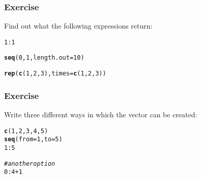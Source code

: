\documentclass[12pt]{beamer}\usepackage[]{graphicx}\usepackage[]{color}
\makeatletter
\newcommand{\hlnum}[1]{\textcolor[rgb]{0.686,0.059,0.569}{#1}}%
\newcommand{\hlcom}[1]{\textcolor[rgb]{0.678,0.584,0.686}{\textit{#1}}}%
\newcommand{\hlopt}[1]{\textcolor[rgb]{0,0,0}{#1}}%
\newcommand{\hlstd}[1]{\textcolor[rgb]{0.345,0.345,0.345}{#1}}%
\newcommand{\hlkwc}[1]{\textcolor[rgb]{0.333,0.667,0.333}{#1}}%
\newcommand{\hlkwd}[1]{\textcolor[rgb]{0.737,0.353,0.396}{\textbf{#1}}}%
\newenvironment{kframe}{%
 \def\at@end@of@kframe{}%
 \ifinner\ifhmode%
  \def\at@end@of@kframe{\end{minipage}}%
  \begin{minipage}{\columnwidth}%
 \fi\fi%
 \def\FrameCommand##1{\hskip\@totalleftmargin \hskip-\fboxsep
 \colorbox{shadecolor}{##1}\hskip-\fboxsep
     \hskip-\linewidth \hskip-\@totalleftmargin \hskip\columnwidth}%
 \MakeFramed {\advance\hsize-\width
   \@totalleftmargin\z@ \linewidth\hsize
   \@setminipage}}%
 {\par\unskip\endMakeFramed%
 \at@end@of@kframe}
\newenvironment{knitrout}{}{} %
\makeatother
\begin{document}

\begin{frame}[fragile]
\frametitle{Exercise}

Find out what the following expressions return:
\begin{knitrout}\footnotesize
{}\color{fgcolor}\begin{kframe}
\begin{alltt}
\hlnum{1}\hlopt{:}\hlnum{1}

\hlkwd{seq}\hlstd{(}\hlnum{0}\hlstd{,} \hlnum{1}\hlstd{,} \hlkwc{length.out} \hlstd{=} \hlnum{10}\hlstd{)}

\hlkwd{rep}\hlstd{(}\hlkwd{c}\hlstd{(}\hlnum{1}\hlstd{,} \hlnum{2}\hlstd{,} \hlnum{3}\hlstd{),} \hlkwc{times} \hlstd{=} \hlkwd{c}\hlstd{(}\hlnum{1}\hlstd{,} \hlnum{2}\hlstd{,} \hlnum{3}\hlstd{))}
\end{alltt}
\end{kframe}
\end{knitrout}

\end{frame}


\begin{frame}[fragile]
\frametitle{Exercise}

Write three different ways in which the vector  can be created:
\pause
\begin{knitrout}\footnotesize
{}\color{fgcolor}\begin{kframe}
\begin{alltt}
\hlkwd{c}\hlstd{(}\hlnum{1}\hlstd{,} \hlnum{2}\hlstd{,} \hlnum{3}\hlstd{,} \hlnum{4}\hlstd{,} \hlnum{5}\hlstd{)}
\hlkwd{seq}\hlstd{(}\hlkwc{from} \hlstd{=} \hlnum{1}\hlstd{,} \hlkwc{to} \hlstd{=} \hlnum{5}\hlstd{)}
\hlnum{1}\hlopt{:}\hlnum{5}

\hlcom{# another option}
\hlnum{0}\hlopt{:}\hlnum{4} \hlopt{+} \hlnum{1}
\end{alltt}
\end{kframe}
\end{knitrout}

\end{frame}

\end{document}
